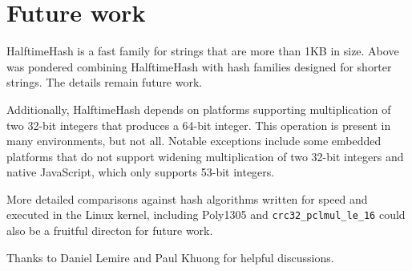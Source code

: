 \documentclass[sigconf, nonacm]{acmart}
\begin{document}


\section{Future work}

HalftimeHash is a fast family for strings that are more than 1KB in size.
Above was pondered combining HalftimeHash with hash families designed for shorter strings.
The details remain future work.

Additionally, HalftimeHash depends on platforms supporting multiplication of two 32-bit integers that produces a 64-bit integer.
This operation is present in many environments, but not all.
Notable exceptions include some embedded platforms that do not support widening multiplication of two 32-bit integers and native JavaScript, which only supports 53-bit integers.

More detailed comparisons against hash algorithms written for speed and executed in the Linux kernel, including Poly1305 and \texttt{crc32\_pclmul\_le\_16} could also be a fruitful directon for future work.



%

\begin{acks}
Thanks to Daniel Lemire and Paul Khuong for helpful discussions.
\end{acks}









\end{document}
